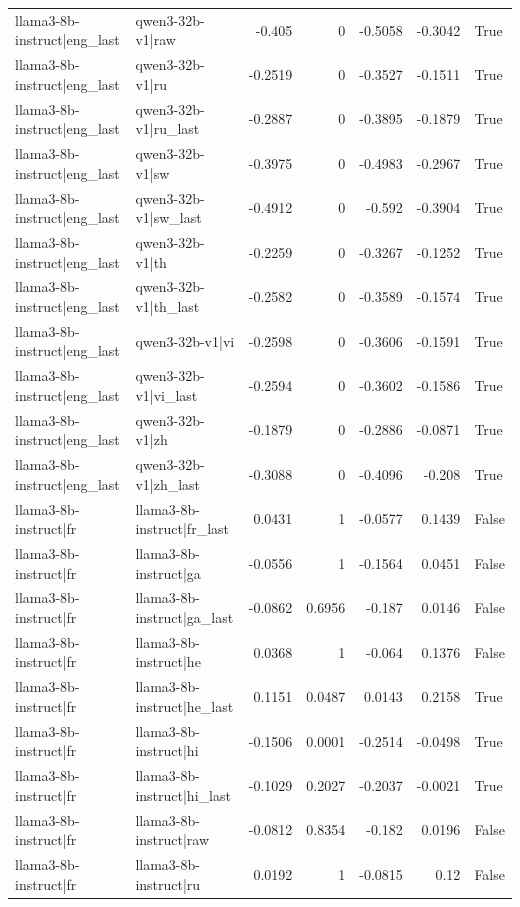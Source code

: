 \begin{table}
\begin{tabular}{l l r r r r l}
llama3-8b-instruct|eng_last & qwen3-32b-v1|raw & -0.405 & 0 & -0.5058 & -0.3042 & True \\
llama3-8b-instruct|eng_last & qwen3-32b-v1|ru & -0.2519 & 0 & -0.3527 & -0.1511 & True \\
llama3-8b-instruct|eng_last & qwen3-32b-v1|ru_last & -0.2887 & 0 & -0.3895 & -0.1879 & True \\
llama3-8b-instruct|eng_last & qwen3-32b-v1|sw & -0.3975 & 0 & -0.4983 & -0.2967 & True \\
llama3-8b-instruct|eng_last & qwen3-32b-v1|sw_last & -0.4912 & 0 & -0.592 & -0.3904 & True \\
llama3-8b-instruct|eng_last & qwen3-32b-v1|th & -0.2259 & 0 & -0.3267 & -0.1252 & True \\
llama3-8b-instruct|eng_last & qwen3-32b-v1|th_last & -0.2582 & 0 & -0.3589 & -0.1574 & True \\
llama3-8b-instruct|eng_last & qwen3-32b-v1|vi & -0.2598 & 0 & -0.3606 & -0.1591 & True \\
llama3-8b-instruct|eng_last & qwen3-32b-v1|vi_last & -0.2594 & 0 & -0.3602 & -0.1586 & True \\
llama3-8b-instruct|eng_last & qwen3-32b-v1|zh & -0.1879 & 0 & -0.2886 & -0.0871 & True \\
llama3-8b-instruct|eng_last & qwen3-32b-v1|zh_last & -0.3088 & 0 & -0.4096 & -0.208 & True \\
llama3-8b-instruct|fr & llama3-8b-instruct|fr_last & 0.0431 & 1 & -0.0577 & 0.1439 & False \\
llama3-8b-instruct|fr & llama3-8b-instruct|ga & -0.0556 & 1 & -0.1564 & 0.0451 & False \\
llama3-8b-instruct|fr & llama3-8b-instruct|ga_last & -0.0862 & 0.6956 & -0.187 & 0.0146 & False \\
llama3-8b-instruct|fr & llama3-8b-instruct|he & 0.0368 & 1 & -0.064 & 0.1376 & False \\
llama3-8b-instruct|fr & llama3-8b-instruct|he_last & 0.1151 & 0.0487 & 0.0143 & 0.2158 & True \\
llama3-8b-instruct|fr & llama3-8b-instruct|hi & -0.1506 & 0.0001 & -0.2514 & -0.0498 & True \\
llama3-8b-instruct|fr & llama3-8b-instruct|hi_last & -0.1029 & 0.2027 & -0.2037 & -0.0021 & True \\
llama3-8b-instruct|fr & llama3-8b-instruct|raw & -0.0812 & 0.8354 & -0.182 & 0.0196 & False \\
llama3-8b-instruct|fr & llama3-8b-instruct|ru & 0.0192 & 1 & -0.0815 & 0.12 & False \\

\end{tabular}
\end{table}
